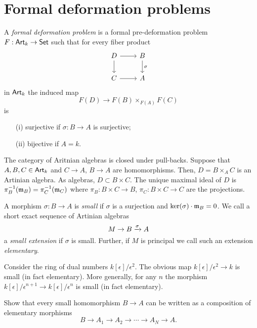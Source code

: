 \documentclass[11pt]{amsart}
\begin{document}
\section{Formal deformation problems}

\begin{dfn}\label{dfn: def}
A {\em formal deformation problem} is a formal pre-deformation problem $F : {\sf Art}_k \to {\sf Set}$ such that for every fiber product
\[
\begin{tikzcd}
D \ar[d] \ar[r] & B \ar[d, "\sigma"] \\
C \ar[r] & A 
\end{tikzcd}
\]
in ${\sf Art}_k$ the induced map
\[
F(D) \to F(B) \times_{F(A)} F(C)
\]
is
\begin{enumerate}
\item[(i)] surjective if $\sigma : B \to A$ is surjective;
\item[(ii)] bijective if $A = k$.
\end{enumerate}
\end{dfn}

\begin{rmk}
The category of Aritnian algebras is closed under pull-backs. 
Suppose that $A,B,C \in {\sf Art}_k$ and $C \to A$, $B \to A$ are homomorphisms.
Then, $D = B \times_A C$ is an Artinian algebra. 
As algebras, $D \subset B \times C$. 
The unique maximal ideal of $D$ is $\pi_B^{-1}({\mathfrak m}_B) = \pi_C^{-1}({\mathfrak m}_C)$ where $\pi_B : B \times C \to B$, $\pi_C : B \times C \to C$ are the projections. 
\end{rmk}

\begin{dfn}
A morphism $\sigma : B \to A$ is {\em small} if $\sigma$ is a surjection and $\ker(\sigma) \cdot {\mathfrak m}_B = 0$. 
We call a short exact sequence of Artinian algebras
\[
M \to B \xrightarrow{\sigma} A
\]
a {\em small extension} if $\sigma$ is small. 
Further, if $M$ is principal we call such an extension {\em elementary}. 
\end{dfn}

\begin{eg}
Consider the ring of dual numbers $k[\epsilon] / \epsilon^2$. 
The obvious map $k[\epsilon] / \epsilon^2 \to k$ is small (in fact elementary). 
More generally, for any $n$ the morphism $k[\epsilon]/\epsilon^{n+1} \to k[\epsilon]/\epsilon^n$ is small (in fact elementary). 
\end{eg}

\begin{ex} 
Show that every small homomorphism $B \to A$ can be written as a composition of elementary morphisms
\[
B \to A_1 \to A_2 \to \cdots \to A_N \to A .
\]
\end{ex}
\end{document}
